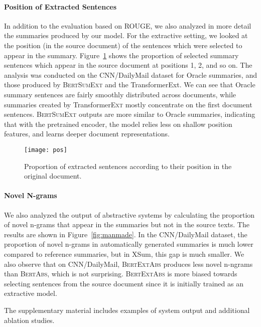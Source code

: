 \documentclass[11pt,a4paper]{article}
\begin{document}
    
    \paragraph{Position of Extracted Sentences}    
    In addition to the evaluation based on ROUGE, we also analyzed in more
    detail the summaries produced by our model. For the extractive
    setting, we looked at the position (in the source document) of the
    sentences which were selected to appear in the
    summary. Figure~\ref{fig:figure1} shows the proportion of selected summary
    sentences which appear in the source document at positions 1, 2, and so on. The
    analysis was conducted on the CNN/DailyMail dataset for Oracle
    summaries, and those produced by \textsc{BertSumExt} and the
    Transformer{\sc Ext}.  We can see that Oracle summary
    sentences are fairly smoothly distributed across documents, while
    summaries created by Transformer\textsc{Ext} mostly concentrate on the first
    document sentences. \textsc{BertSumExt} outputs are more similar to Oracle
    summaries, indicating that with the pretrained encoder, the model
    relies less on shallow position features, and learns deeper document
    representations.
    
    \begin{figure}[t]
        \centering
        \hspace*{-1ex}\texttt{[image: pos]}
        \caption{Proportion of extracted sentences according to their
            position in the original document.}
        \label{fig:figure1}
    \end{figure}
    \paragraph{Novel N-grams} We also analyzed the output of
    abstractive systems by calculating the proportion of novel n-grams that
    appear in the summaries but not in the source texts.  The results
    are shown in Figure~\ref{fig:manmade}. In the CNN/DailyMail
    dataset, the proportion of novel n-grams in automatically
    generated summaries is much lower compared to reference summaries,
    but in XSum, this gap is much smaller.  We also observe that on
    CNN/DailyMail, \textsc{BertExtAbs} produces less novel n-ngrams
    than \textsc{BertAbs}, which is not surprising. \textsc{BertExtAbs}
    is more biased towards selecting sentences from the source
    document since it is initially trained as an extractive model.
    
    The supplementary material includes examples of system output and
additional ablation studies. 
\end{document}
